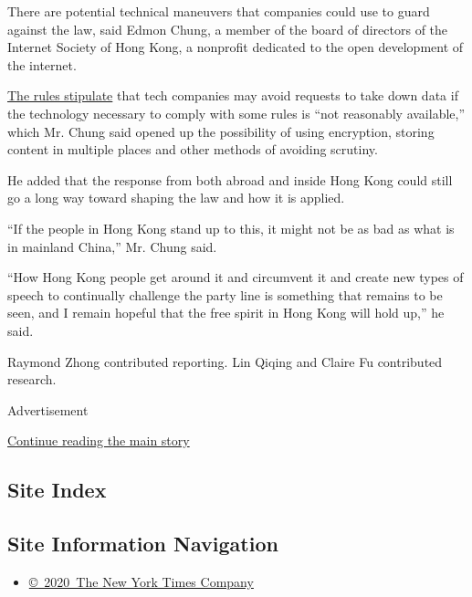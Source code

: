 There are potential technical maneuvers that companies could use to
guard against the law, said Edmon Chung, a member of the board of
directors of the Internet Society of Hong Kong, a nonprofit dedicated to
the open development of the internet.

\href{https://www.info.gov.hk/gia/general/202007/06/P2020070600784.htm?fontSize=1}{The
rules stipulate} that tech companies may avoid requests to take down
data if the technology necessary to comply with some rules is ``not
reasonably available,'' which Mr. Chung said opened up the possibility
of using encryption, storing content in multiple places and other
methods of avoiding scrutiny.

He added that the response from both abroad and inside Hong Kong could
still go a long way toward shaping the law and how it is applied.

``If the people in Hong Kong stand up to this, it might not be as bad as
what is in mainland China,'' Mr. Chung said.

``How Hong Kong people get around it and circumvent it and create new
types of speech to continually challenge the party line is something
that remains to be seen, and I remain hopeful that the free spirit in
Hong Kong will hold up,'' he said.

Raymond Zhong contributed reporting. Lin Qiqing and Claire Fu
contributed research.

Advertisement

\protect\hyperlink{after-bottom}{Continue reading the main story}

\hypertarget{site-index}{%
\subsection{Site Index}\label{site-index}}

\hypertarget{site-information-navigation}{%
\subsection{Site Information
Navigation}\label{site-information-navigation}}

\begin{itemize}
\tightlist
\item
  \href{https://help.nytimes.com/hc/en-us/articles/115014792127-Copyright-notice}{©~2020~The
  New York Times Company}
\end{itemize}

